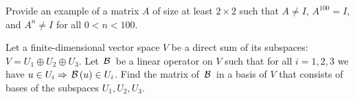 \begin{problem}
Provide an example of a matrix $A$ of size at least $2 \times 2$ such that $A\neq I$, $A^{100} = I$, and $A^n \neq I$ for all $0 < n < 100$.
\end{problem}

\begin{problem}
Let a finite-dimensional vector space $V$ be a direct sum of its subspaces: $V = U_1\oplus U_2\oplus U_3$. Let $\,\mathcal{B}\,$ be a linear operator on $V$ such that for all $i=1,2,3$ we have $u\in U_i \Rightarrow \,\mathcal{B}\,(u)\in U_i$. Find the matrix of $\,\mathcal{B}\,$ in a basis of $V$ that consists of bases of the subspaces $U_1, U_2, U_3$.
\end{problem}
